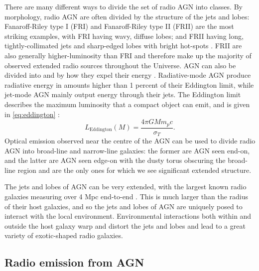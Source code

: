         There are many different ways to divide the set of radio AGN into classes. By morphology, radio AGN are often divided by the structure of the jets and lobes: Fanaroff-Riley type I (FRI) and Fanaroff-Riley type II (FRII) are the most striking examples, with FRI having wavy, diffuse lobes; and FRII having long, tightly-collimated jets and sharp-edged lobes with bright hot-spots \citep{urry_unified_1995}. FRII are also generally higher-luminosity \citep{fanaroff_morphology_1974} than FRI and therefore make up the majority of observed extended radio sources throughout the Universe. AGN can also be divided into  and  by how they expel their energy \citep{heckman_coevolution_2014}. Radiative-mode AGN produce radiative energy in amounts higher than 1 percent of their Eddington limit, while jet-mode AGN mainly output energy through their jets. The Eddington limit describes the maximum luminosity that a compact object can emit, and is given in \autoref{eq:eddington} \citep{rybicki_radiative_1979}:
        \begin{equation}
            L_{\mathrm{Eddington}}(M) = \frac{4\pi G M m_p c}{\sigma_T}.
            \label{eq:eddington}
        \end{equation}
        Optical emission observed near the centre of the AGN can be used to divide radio AGN into broad-line and narrow-line galaxies: the former are AGN seen end-on, and the latter are AGN seen edge-on with the dusty torus obscuring the broad-line region and are the only ones for which we see significant extended structure.

        The jets and lobes of AGN can be very extended, with the largest known radio galaxies measuring over 4 Mpc end-to-end \citep{machalski_understanding_2011}. This is much larger than the radius of their host galaxies, and so the jets and lobes of AGN are uniquely posed to interact with the local environment. Environmental interactions both within and outside the host galaxy warp and distort the jets and lobes and lead to a great variety of exotic-shaped radio galaxies.

    \subsection{Radio emission from AGN}
        
